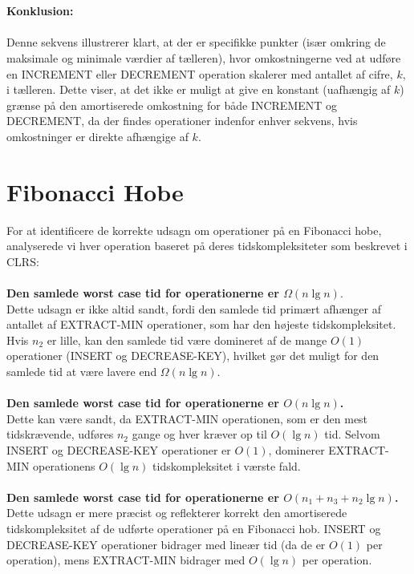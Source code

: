 \documentclass{article}
\begin{document}
\\
\\
\textbf{Konklusion:}
\\
\\
Denne sekvens illustrerer klart, at der er specifikke punkter (især omkring de maksimale og minimale værdier af tælleren), hvor omkostningerne ved at udføre en INCREMENT eller DECREMENT operation skalerer med antallet af cifre, $k$, i tælleren. Dette viser, at det ikke er muligt at give en konstant (uafhængig af $k$) grænse på den amortiserede omkostning for både INCREMENT og DECREMENT, da der findes operationer indenfor enhver sekvens, hvis omkostninger er direkte afhængige af $k$.

\section{Fibonacci Hobe}
For at identificere de korrekte udsagn om operationer på en Fibonacci hobe, analyserede vi hver operation baseret på deres tidskompleksiteter som beskrevet i CLRS:
\\
\\
\textbf{Den samlede worst case tid for operationerne er $\Omega(n \lg n)$}. \\
Dette udsagn er ikke altid sandt, fordi den samlede tid primært afhænger af antallet af EXTRACT-MIN operationer, som har den højeste tidskompleksitet. Hvis $n_2$ er lille, kan den samlede tid være domineret af de mange $O(1)$ operationer (INSERT og DECREASE-KEY), hvilket gør det muligt for den samlede tid at være lavere end $\Omega(n \lg n)$.
\\
\\
\textbf{Den samlede worst case tid for operationerne er $O(n \lg n)$.} 
\\
Dette kan være sandt, da EXTRACT-MIN operationen, som er den mest tidskrævende, udføres $n_2$ gange og hver kræver op til $O(\lg n)$ tid. Selvom INSERT og DECREASE-KEY operationer er $O(1)$, dominerer EXTRACT-MIN operationens $O(\lg n)$ tidskompleksitet i værste fald.
\\
\\
\textbf{Den samlede worst case tid for operationerne er $O\left(n_1+n_3+n_2 \lg n\right)$.} 
\\
Dette udsagn er mere præcist og reflekterer korrekt den amortiserede tidskompleksitet af de udførte operationer på en Fibonacci hob. INSERT og DECREASE-KEY operationer bidrager med lineær tid (da de er $O(1)$ per operation), mens EXTRACT-MIN bidrager med $O(\lg n)$ per operation.
\\
\end{document}
